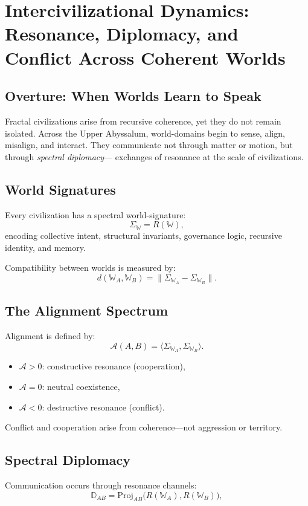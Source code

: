 
\chapter{Intercivilizational Dynamics: Resonance, Diplomacy, and Conflict Across Coherent Worlds}
\label{ch:intercivilizational-dynamics}

\section*{Overture: When Worlds Learn to Speak}
Fractal civilizations arise from recursive coherence, yet they do not remain isolated.  
Across the Upper Abyssalum, world-domains begin to sense, align, misalign, and interact.  
They communicate not through matter or motion, but through \emph{spectral diplomacy}—  
exchanges of resonance at the scale of civilizations.

\section{World Signatures}
Every civilization has a spectral world-signature:
\[
\Sigma_{\mathbb{W}} = R(\mathbb{W}),
\]
encoding collective intent, structural invariants, governance logic, recursive identity, and memory.

Compatibility between worlds is measured by:
\[
d(\mathbb{W}_A,\mathbb{W}_B)
=
\big\| \Sigma_{\mathbb{W}_A} - \Sigma_{\mathbb{W}_B} \big\|.
\]

\section{The Alignment Spectrum}
Alignment is defined by:
\[
\mathcal{A}(A,B)
=
\langle
\Sigma_{\mathbb{W}_A},
\Sigma_{\mathbb{W}_B}
\rangle.
\]

\begin{itemize}
  \item $\mathcal{A} > 0$: constructive resonance (cooperation),
  \item $\mathcal{A} = 0$: neutral coexistence,
  \item $\mathcal{A} < 0$: destructive resonance (conflict).
\end{itemize}

Conflict and cooperation arise from coherence—not aggression or territory.

\section{Spectral Diplomacy}
Communication occurs through resonance channels:
\[
\mathbb{D}_{AB}
=
\mathrm{Proj}_{AB}
\big(R(\mathbb{W}_A),R(\mathbb{W}_B)\big),
\]

